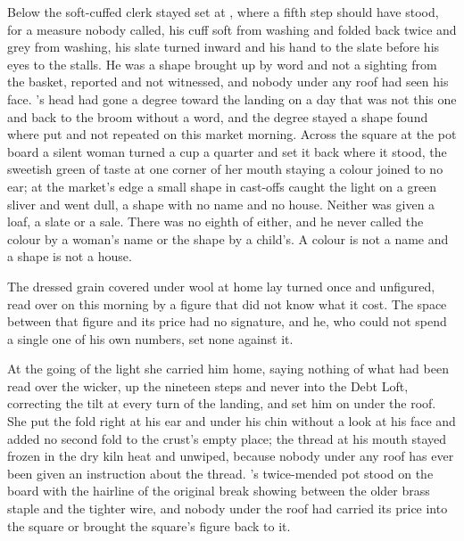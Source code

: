 Below  the soft-cuffed clerk stayed set at , where a fifth step should have stood, for a measure nobody called, his cuff soft from washing and folded back twice and grey from washing, his slate turned inward and his hand to the slate before his eyes to the stalls. He was a shape brought up by word and not a sighting from the basket, reported and not witnessed, and nobody under any roof had seen his face. 's head had gone a degree toward the landing on a day that was not this one and back to the broom without a word, and the degree stayed a shape found where put and not repeated on this market morning. Across the square at the pot board a silent woman turned a cup a quarter and set it back where it stood, the sweetish green of taste at one corner of her mouth staying a colour joined to no ear; at the market's edge a small shape in cast-offs caught the light on a green sliver and went dull, a shape with no name and no house. Neither was given a loaf, a slate or a sale. There was no eighth of either, and he never called the colour by a woman's name or the shape by a child's. A colour is not a name and a shape is not a house.

The dressed grain covered under wool at home lay turned once and unfigured, read over on this morning by a figure that did not know what it cost. The space between that figure and its price had no signature, and he, who could not spend a single one of his own numbers, set none against it.

At the going of the light she carried him home, saying nothing of what had been read over the wicker, up the nineteen steps and never into the Debt Loft, correcting the tilt at every turn of the landing, and set him on  under the roof. She put the fold right at his ear and under his chin without a look at his face and added no second fold to the crust's empty place; the thread at his mouth stayed frozen in the dry kiln heat and unwiped, because nobody under any roof has ever been given an instruction about the thread. 's twice-mended pot stood on the board with the hairline of the original break showing between the older brass staple and the tighter wire, and nobody under the roof had carried its price into the square or brought the square's figure back to it.

